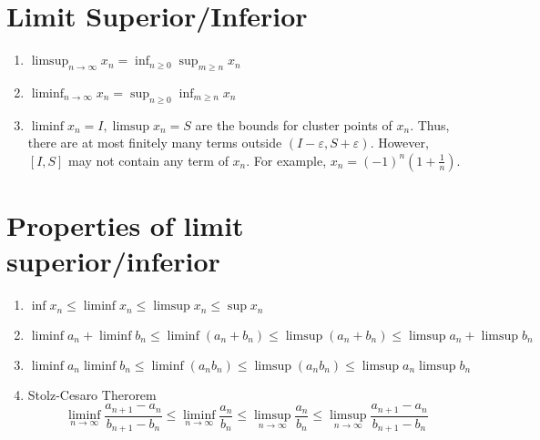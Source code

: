 \section{Limit Superior/Inferior}
\begin{enumerate}
	\item $\displaystyle \limsup_{n \to \infty} x_n = \inf_{n \ge 0} \sup_{m \ge n} x_n $
	\item $ \displaystyle \liminf_{n \to \infty} x_n = \sup_{n \ge 0} \inf_{m \ge n} x_n $
	\item $\liminf x_n  = I,\limsup x_n = S$ are the bounds for cluster points of $x_n$.
	Thus, there are at most finitely many terms outside $(I-\varepsilon,S+\varepsilon)$.
	However, $[I,S]$ may not contain any term of $x_n$.
	For example, $x_n = (-1)^n (1+\frac{1}{n})$.
\end{enumerate}

\section{Properties of limit superior/inferior}
\begin{enumerate}
	\item $\inf x_n \le \liminf x_n \le \limsup x_n \le \sup x_n $
	\item $ \liminf a_n + \liminf b_n \le \liminf (a_n+b_n) \le \limsup (a_n + b_n) \le \limsup a_n + \limsup b_n $ 
	\item $ \liminf a_n \liminf b_n \le \liminf (a_n b_n) \le \limsup (a_n b_n) \le \limsup a_n \limsup b_n  $
	\item Stolz-Cesaro Therorem
		\[ \liminf_{n \to \infty} \frac{a_{n+1}-a_n}{b_{n+1}-b_n} \le \liminf_{n \to \infty} \frac{a_n}{b_n} \le \limsup_{n \to \infty} \frac{a_n}{b_n} \le \limsup_{n \to \infty} \frac{a_{n+1}-a_n}{b_{n+1}-b_n} \]
\end{enumerate}

